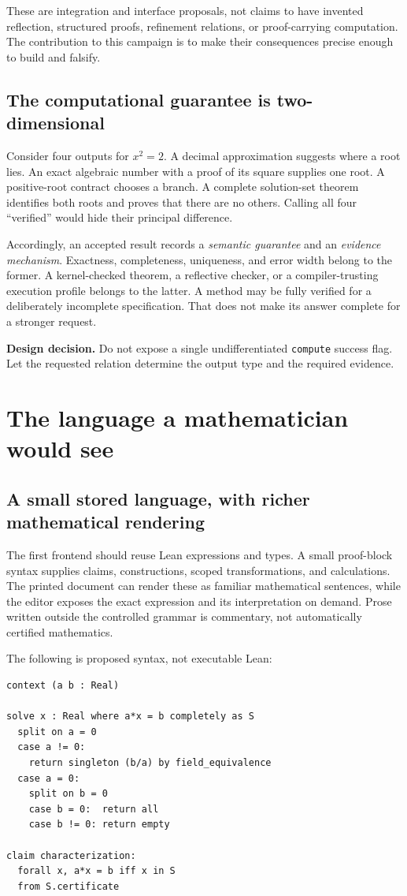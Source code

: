 \documentclass[11pt,letterpaper]{article}
\newcommand{\code}[1]{\nolinkurl{#1}}
\newcommand{\decision}[1]{\par\smallskip\textbf{Design decision.} #1\par\smallskip}
\theoremstyle{definition}
\begin{document}
These are integration and interface proposals, not claims to have invented
reflection, structured proofs, refinement relations, or proof-carrying computation.
The contribution to this campaign is to make their consequences precise enough
to build and falsify.

\subsection{The computational guarantee is two-dimensional}
Consider four outputs for \(x^2=2\). A decimal approximation suggests where a root
lies. An exact algebraic number with a proof of its square supplies one root. A
positive-root contract chooses a branch. A complete solution-set theorem identifies
both roots and proves that there are no others. Calling all four ``verified''
would hide their principal difference.

Accordingly, an accepted result records a \emph{semantic guarantee} and an
\emph{evidence mechanism}. Exactness, completeness, uniqueness, and error width
belong to the former. A kernel-checked theorem, a reflective checker, or a
compiler-trusting execution profile belongs to the latter. A method may be fully
verified for a deliberately incomplete specification. That does not make its
answer complete for a stronger request.

\decision{Do not expose a single undifferentiated \code{compute} success flag.
Let the requested relation determine the output type and the required evidence.}

\section{The language a mathematician would see}\label{sec:surface}
\subsection{A small stored language, with richer mathematical rendering}
The first frontend should reuse Lean expressions and types. A small proof-block
syntax supplies claims, constructions, scoped transformations, and calculations.
The printed document can render these as familiar mathematical sentences, while
the editor exposes the exact expression and its interpretation on demand. Prose
written outside the controlled grammar is commentary, not automatically certified
mathematics.

The following is proposed syntax, not executable Lean:
\begin{lstlisting}
context (a b : Real)

solve x : Real where a*x = b completely as S
  split on a = 0
  case a != 0:
    return singleton (b/a) by field_equivalence
  case a = 0:
    split on b = 0
    case b = 0:  return all
    case b != 0: return empty

claim characterization:
  forall x, a*x = b iff x in S
  from S.certificate
\end{lstlisting}
\end{document}
